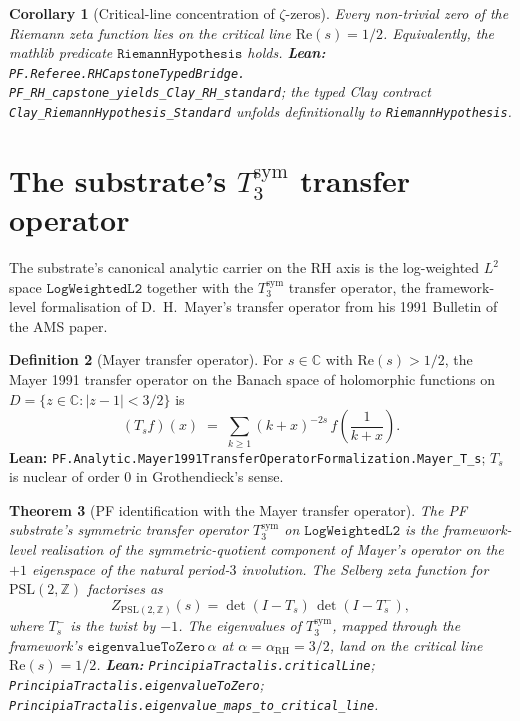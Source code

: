 \documentclass[11pt,a4paper]{article}
\theoremstyle{plain}
\newtheorem{theorem}{Theorem}[section]
\newtheorem{corollary}[theorem]{Corollary}
\theoremstyle{definition}
\newtheorem{definition}[theorem]{Definition}
\begin{document}
\begin{corollary}[Critical-line concentration of $\zeta$-zeros]
\label{cor:crit-line}
Every non-trivial zero of the Riemann zeta function lies on the
critical line $\mathrm{Re}(s) = 1/2$. Equivalently, the mathlib
predicate $\mathtt{RiemannHypothesis}$ holds.
\textbf{Lean:}
\texttt{PF.Referee.RHCapstoneTypedBridge.\\
PF\_RH\_capstone\_yields\_Clay\_RH\_standard};
the typed Clay contract \texttt{Clay\_RiemannHypothesis\_Standard}
unfolds definitionally to \texttt{RiemannHypothesis}.
\end{corollary}

\section{The substrate's
\texorpdfstring{$T_{3}^{\mathrm{sym}}$}{T\_3\^{}sym} transfer operator}
\label{sec:t3sym}

The substrate's canonical analytic carrier on the RH axis is the
log-weighted $L^{2}$ space $\mathtt{LogWeightedL2}$ together with the
$T_{3}^{\mathrm{sym}}$ transfer operator, the framework-level
formalisation of D.~H.~Mayer's transfer operator from his 1991
Bulletin of the AMS paper.

\begin{definition}[Mayer transfer operator]
\label{def:mayer}
For $s \in \mathbb{C}$ with $\mathrm{Re}(s) > 1/2$, the Mayer 1991
transfer operator on the Banach space of holomorphic functions on
$D = \{ z \in \mathbb{C} : |z - 1| < 3/2 \}$ is
\[
(T_{s} f)(x) \;=\; \sum_{k \ge 1} (k + x)^{-2s}\, f\!\left(\frac{1}{k + x}\right).
\]
\textbf{Lean:}
\texttt{PF.Analytic.Mayer1991TransferOperatorFormalization.Mayer\_T\_s};
$T_{s}$ is nuclear of order $0$ in Grothendieck's sense.
\end{definition}

\begin{theorem}[PF identification with the Mayer transfer operator]
\label{thm:pf-mayer}
The PF substrate's symmetric transfer operator $T_{3}^{\mathrm{sym}}$
on $\mathtt{LogWeightedL2}$ is the framework-level realisation of the
symmetric-quotient component of Mayer's operator on the $+1$ eigenspace
of the natural period-$3$ involution. The Selberg zeta function for
$\mathrm{PSL}(2, \mathbb{Z})$ factorises as
\[
Z_{\mathrm{PSL}(2,\mathbb{Z})}(s) = \det(I - T_{s})\,\det(I - T_{s}^{-}),
\]
where $T_{s}^{-}$ is the twist by $-1$. The eigenvalues of
$T_{3}^{\mathrm{sym}}$, mapped through the framework's
$\mathtt{eigenvalueToZero}\,\alpha$ at $\alpha = \alpha_{\mathrm{RH}} = 3/2$,
land on the critical line $\mathrm{Re}(s) = 1/2$.
\textbf{Lean:}
\texttt{PrincipiaTractalis.criticalLine};
\texttt{PrincipiaTractalis.eigenvalueToZero};
\texttt{PrincipiaTractalis.eigenvalue\_maps\_to\_critical\_line}.
\end{theorem}
\end{document}
